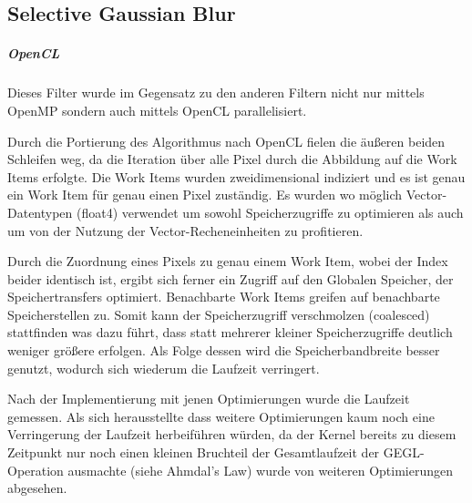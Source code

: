 \documentclass[10pt,a4paper]{article}
\begin{document}
\subsection{Selective Gaussian Blur}

\subparagraph{OpenCL}
Dieses Filter wurde im Gegensatz zu den anderen Filtern nicht nur mittels OpenMP sondern auch mittels OpenCL parallelisiert. 



Durch die Portierung des Algorithmus nach OpenCL fielen die äußeren beiden Schleifen weg, da die Iteration über alle Pixel durch die Abbildung auf die Work Items erfolgte. Die Work Items wurden zweidimensional indiziert und es ist genau ein Work Item für genau einen Pixel zuständig.
Es wurden wo möglich Vector-Datentypen (float4) verwendet um sowohl Speicherzugriffe zu optimieren als auch um von der Nutzung der Vector-Recheneinheiten zu profitieren.

Durch die Zuordnung eines Pixels zu genau einem Work Item, wobei der Index beider identisch ist, ergibt sich ferner ein Zugriff auf den Globalen Speicher, der Speichertransfers optimiert. Benachbarte Work Items greifen auf benachbarte Speicherstellen zu. Somit kann der Speicherzugriff verschmolzen (coalesced) stattfinden was dazu führt, dass statt mehrerer kleiner Speicherzugriffe deutlich weniger größere erfolgen. Als Folge dessen wird die Speicherbandbreite besser genutzt, wodurch sich wiederum die Laufzeit verringert.

Nach der Implementierung mit jenen Optimierungen wurde die Laufzeit gemessen. Als sich herausstellte dass weitere Optimierungen kaum noch eine Verringerung der Laufzeit herbeiführen würden, da der Kernel bereits zu diesem Zeitpunkt nur noch einen kleinen Bruchteil der Gesamtlaufzeit der GEGL-Operation ausmachte (siehe Ahmdal's Law) wurde von weiteren Optimierungen abgesehen.
\end{document}
